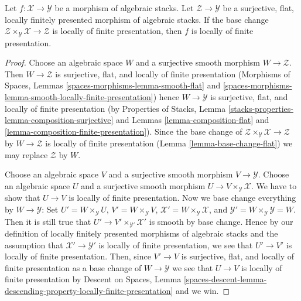 \begin{lemma}
\label{lemma-descent-finite-presentation}
Let $f : \mathcal{X} \to \mathcal{Y}$ be a morphism of algebraic stacks.
Let $\mathcal{Z} \to \mathcal{Y}$ be a surjective, flat, locally finitely
presented morphism of algebraic stacks. If the base change
$\mathcal{Z} \times_\mathcal{Y} \mathcal{X} \to \mathcal{Z}$
is locally of finite presentation, then $f$ is locally of finite
presentation.
\end{lemma}

\begin{proof}
Choose an algebraic space $W$ and a surjective smooth morphism
$W \to \mathcal{Z}$. Then $W \to \mathcal{Z}$ is surjective, flat,
and locally of finite presentation
(Morphisms of Spaces, Lemmas
\ref{spaces-morphisms-lemma-smooth-flat} and
\ref{spaces-morphisms-lemma-smooth-locally-finite-presentation})
hence $W \to \mathcal{Y}$ is surjective, flat, and locally of finite
presentation (by
Properties of Stacks, Lemma
\ref{stacks-properties-lemma-composition-surjective}
and
Lemmas \ref{lemma-composition-flat} and
\ref{lemma-composition-finite-presentation}).
Since the base change of
$\mathcal{Z} \times_\mathcal{Y} \mathcal{X} \to \mathcal{Z}$
by $W \to \mathcal{Z}$ is
locally of finite presentation
(Lemma \ref{lemma-base-change-flat})
we may replace $\mathcal{Z}$ by $W$.

\medskip\noindent
Choose an algebraic space $V$ and a surjective smooth morphism
$V \to \mathcal{Y}$. Choose an algebraic space $U$ and a surjective
smooth morphism $U \to V \times_\mathcal{Y} \mathcal{X}$.
We have to show that $U \to V$ is locally of finite presentation.
Now we base change everything by $W \to \mathcal{Y}$: Set
$U' = W \times_\mathcal{Y} U$,
$V' = W \times_\mathcal{Y} V$,
$\mathcal{X}' = W \times_\mathcal{Y} \mathcal{X}$,
and $\mathcal{Y}' = W \times_\mathcal{Y} \mathcal{Y} = W$.
Then it is still true that $U' \to V' \times_{\mathcal{Y}'} \mathcal{X}'$
is smooth by base change. Hence by our definition of locally finitely
presented morphisms of algebraic stacks and the assumption that
$\mathcal{X}' \to \mathcal{Y}'$ is locally of finite presentation,
we see that $U' \to V'$ is locally of finite presentation. Then, since
$V' \to V$ is surjective, flat, and locally of finite presentation
as a base change of $W \to \mathcal{Y}$ we see that $U \to V$ is
locally of finite presentation by
Descent on Spaces, Lemma
\ref{spaces-descent-lemma-descending-property-locally-finite-presentation}
and we win.
\end{proof}

